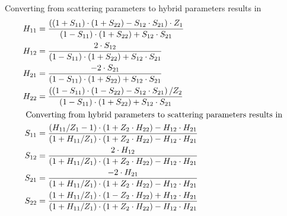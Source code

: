 Converting from scattering parameters to hybrid parameters results in
\begin{align}
H_{11} &= \dfrac{\left(\left(1 + S_{11}\right)\cdot \left(1 + S_{22}\right) - S_{12}\cdot S_{21}\right)\cdot Z_{1}}{\left(1 - S_{11}\right)\cdot \left(1 + S_{22}\right) + S_{12}\cdot S_{21}}\\
H_{12} &= \dfrac{2\cdot S_{12}}{\left(1 - S_{11}\right)\cdot \left(1 + S_{22}\right) + S_{12}\cdot S_{21}}\\
H_{21} &= \dfrac{-2\cdot S_{21}}{\left(1 - S_{11}\right)\cdot \left(1 + S_{22}\right) + S_{12}\cdot S_{21}}\\
H_{22} &= \dfrac{\left(\left(1 - S_{11}\right)\cdot \left(1 - S_{22}\right) - S_{12}\cdot S_{21}\right) / Z_{2}}{\left(1 - S_{11}\right)\cdot \left(1 + S_{22}\right) + S_{12}\cdot S_{21}}\\
\intertext{
Converting from hybrid parameters to scattering parameters results in
}
S_{11} &= \dfrac{\left(H_{11} / Z_{1} - 1\right)\cdot \left(1 + Z_{2}\cdot H_{22}\right) - H_{12}\cdot H_{21}}{\left(1 + H_{11} / Z_{1}\right)\cdot \left(1 + Z_{2}\cdot H_{22}\right) - H_{12}\cdot H_{21}}\\
S_{12} &= \dfrac{2\cdot H_{12}}{\left(1 + H_{11} / Z_{1}\right)\cdot \left(1 + Z_{2}\cdot H_{22}\right) - H_{12}\cdot H_{21}}\\
S_{21} &= \dfrac{-2\cdot H_{21}}{\left(1 + H_{11} / Z_{1}\right)\cdot \left(1 + Z_{2}\cdot H_{22}\right) - H_{12}\cdot H_{21}}\\
S_{22} &= \dfrac{\left(1 + H_{11} / Z_{1}\right)\cdot \left(1 - Z_{2}\cdot H_{22}\right) + H_{12}\cdot H_{21}}{\left(1 + H_{11} / Z_{1}\right)\cdot \left(1 + Z_{2}\cdot H_{22}\right) - H_{12}\cdot H_{21}}
\end{align}


